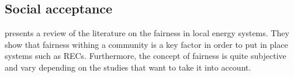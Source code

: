 



\subsection{Social acceptance}
\label{section_fairness}
\cite{article_8} presents a review of the literature on the fairness in local energy systems. They show that fairness withing a community is a key factor in order to put in place systems such as RECs. Furthermore, the concept of fairness is quite subjective and vary depending on the studies that want to take it into account.

